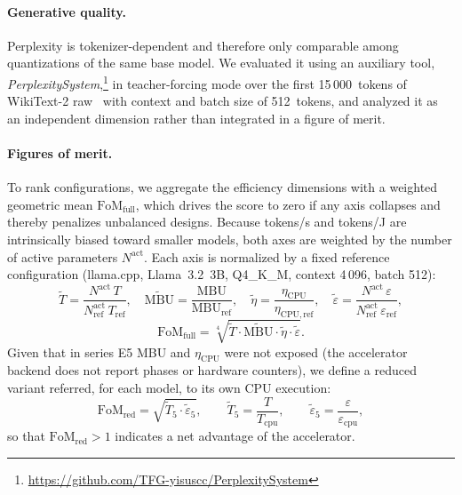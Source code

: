 \documentclass[acmsmall,natbib=false]{acmart}
\begin{document}
\paragraph{Generative quality.}
Perplexity is tokenizer-dependent and therefore only comparable among
quantizations of the same base model. We evaluated it using an auxiliary tool,
\textit{PerplexitySystem},\footnote{\url{https://github.com/TFG-yisuscc/PerplexitySystem}}
in teacher-forcing mode over the first 15\,000~tokens of WikiText-2
raw~\cite{merity2016pointer} with context and batch size of 512~tokens, and
analyzed it as an independent dimension rather than integrated in a figure of
merit.

\paragraph{Figures of merit.}
To rank configurations, we aggregate the efficiency dimensions with a
weighted geometric mean $\mathrm{FoM}_{\mathrm{full}}$, which drives the score to zero if any axis collapses
and thereby penalizes unbalanced designs. Because tokens/s and tokens/J are
intrinsically biased toward smaller models, both axes are weighted by the
number of active parameters $N^{\mathrm{act}}$. Each axis is normalized by a
fixed reference configuration (llama.cpp, Llama~3.2~3B, Q4\_K\_M, context
4\,096, batch 512):
\begin{equation}
  \tilde{T} = \frac{N^{\mathrm{act}}\,T}{N^{\mathrm{act}}_{\mathrm{ref}}\,T_{\mathrm{ref}}},\quad
  \widetilde{\mathrm{MBU}} = \frac{\mathrm{MBU}}{\mathrm{MBU}_{\mathrm{ref}}},\quad
  \tilde{\eta} = \frac{\eta_{\mathrm{CPU}}}{\eta_{\mathrm{CPU,ref}}},\quad
  \tilde{\varepsilon} = \frac{N^{\mathrm{act}}\,\varepsilon}{N^{\mathrm{act}}_{\mathrm{ref}}\,\varepsilon_{\mathrm{ref}}} ,
\end{equation}
\begin{equation}
  \mathrm{FoM}_{\mathrm{full}} =
  \sqrt[4]{\tilde{T}\cdot\widetilde{\mathrm{MBU}}\cdot\tilde{\eta}\cdot\tilde{\varepsilon}} .
  \label{eq:fom_full}
\end{equation}
Given that in series E5 MBU and $\eta_{\mathrm{CPU}}$ were not exposed (the accelerator backend
does not report phases or hardware counters), we define a reduced variant
referred, for each model, to its own CPU execution:
\begin{equation}
  \mathrm{FoM}_{\mathrm{red}} = \sqrt{\tilde{T}_{5}\cdot\tilde{\varepsilon}_{5}},
  \qquad
  \tilde{T}_{5} = \frac{T}{T_{\mathrm{cpu}}},\qquad
  \tilde{\varepsilon}_{5} = \frac{\varepsilon}{\varepsilon_{\mathrm{cpu}}} ,
  \label{eq:fom_red}
\end{equation}
so that $\mathrm{FoM}_{\mathrm{red}}>1$ indicates a net advantage of the
accelerator.
\end{document}

